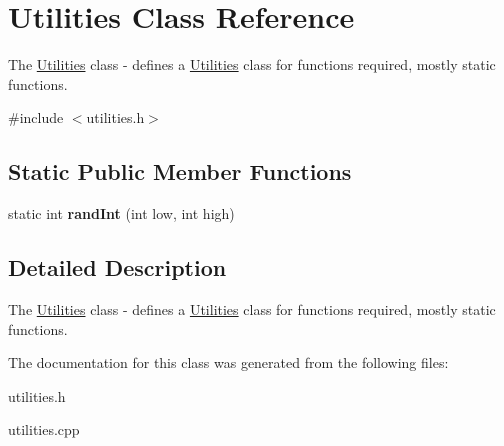 \hypertarget{class_utilities}{}\section{Utilities Class Reference}
\label{class_utilities}


The \hyperlink{class_utilities}{Utilities} class -\/ defines a \hyperlink{class_utilities}{Utilities} class for functions required, mostly static functions.  




{\ttfamily \#include $<$utilities.\+h$>$}

\subsection*{Static Public Member Functions}
\begin{DoxyCompactItemize}
\item 
\mbox{\label{class_utilities_ab8d1ca3ddf49e268e7bc2669da100369}} 
static int {\bfseries rand\+Int} (int low, int high)
\end{DoxyCompactItemize}


\subsection{Detailed Description}
The \hyperlink{class_utilities}{Utilities} class -\/ defines a \hyperlink{class_utilities}{Utilities} class for functions required, mostly static functions. 

The documentation for this class was generated from the following files\+:\begin{DoxyCompactItemize}
\item 
utilities.\+h\item 
utilities.\+cpp\end{DoxyCompactItemize}
